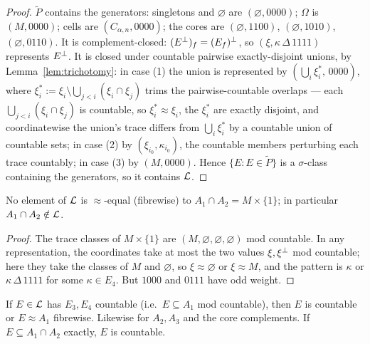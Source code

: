 \begin{proof}
$\widetilde P$ contains the generators: singletons and $\varnothing$ are
$(\varnothing,0000)$; $\Omega$ is $(M,0000)$; cells are $(C_{\alpha,n},0000)$;
the cores are $(\varnothing,1100)$, $(\varnothing,1010)$, $(\varnothing,0110)$.
It is complement-closed: $(E{}^{\perp})_f=(E_f){}^{\perp}$, so $(\xi,\kappa\,\Delta\,1111)$
represents $E{}^{\perp}$. It is closed under countable pairwise exactly-disjoint
unions, by Lemma~\ref{lem:trichotomy}: in case (1) the union is represented by
$(\bigcup_i\xi_i^\ast,\,0000)$, where
$\xi_i^\ast := \xi_i\setminus\bigcup_{j<i}(\xi_i\cap\xi_j)$ trims the
pairwise-countable overlaps --- each $\bigcup_{j<i}(\xi_i\cap\xi_j)$ is countable,
so $\xi_i^\ast\approx\xi_i$, the $\xi_i^\ast$ are exactly disjoint, and
coordinatewise the union's trace differs from $\bigcup_i\xi_i^\ast$ by a
countable union of countable sets; in case (2) by $(\xi_{i_0},\kappa_{i_0})$,
the countable members perturbing each trace countably; in case (3) by
$(M,0000)$. Hence $\{E : E\in\widetilde P\}$ is a $\sigma$-class containing the
generators, so it contains $\mathcal{L}$.
\end{proof}

\begin{corollary}\label{cor:meet-region}
No element of $\mathcal{L}$ is $\approx$-equal (fibrewise) to $A_1\cap A_2=M\times\{1\}$;
in particular $A_1\cap A_2\notin\mathcal{L}$.
\end{corollary}

\begin{proof}
The trace classes of $M\times\{1\}$ are $(M,\varnothing,\varnothing,\varnothing)$
mod countable. In any representation, the coordinates take at most the two
values $\xi,\xi{}^{\perp}$ mod countable; here they take the classes of $M$ and
$\varnothing$, so $\xi\approx\varnothing$ or $\xi\approx M$, and the pattern is
$\kappa$ or $\kappa\,\Delta\,1111$ for some $\kappa\in E_4$. But $1000$ and
$0111$ have odd weight.
\end{proof}

\begin{corollary}\label{cor:stripping}
If $E\in\mathcal{L}$ has $E_3,E_4$ countable (i.e.\ $E\subseteq A_1$ mod countable),
then $E$ is countable or $E\approx A_1$ fibrewise. Likewise for $A_2,A_3$ and
the core complements. If $E\subseteq A_1\cap A_2$ exactly, $E$ is countable.
\end{corollary}

